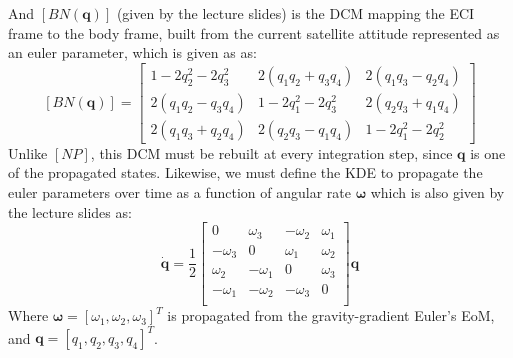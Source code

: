\documentclass[titlepage]{article}
\begin{document}
And $\left[BN(\boldsymbol{q})\right]$ (given by the lecture slides) is the DCM mapping the ECI frame to the body frame, built from the current satellite attitude represented as an euler parameter, which is given as as:
\begin{equation}
	\left[BN(\boldsymbol{q})\right]=
	\begin{bmatrix}
		1-2q_2^2-2q_3^2 & 2\left(q_1q_2+q_3q_4\right) & 2\left(q_1q_3-q_2q_4\right)\\
		2\left(q_1q_2-q_3q_4\right) & 1-2q_1^2-2q_3^2 & 2\left(q_2q_3+q_1q_4\right)\\
		2\left(q_1q_3+q_2q_4\right) & 2\left(q_2q_3-q_1q_4\right) & 1-2q_1^2-2q_2^2
	\end{bmatrix}
\end{equation}
Unlike $\left[NP\right]$, this DCM must be rebuilt at every integration step, since $\boldsymbol{q}$ is one of the propagated states. Likewise, we must define the KDE to propagate the euler parameters over time as a function of angular rate $\boldsymbol{\omega}$ which is also given by the lecture slides as:
\begin{equation}
	\dot{\boldsymbol{q}}=\frac{1}{2}
	\begin{bmatrix}
		0 & \omega_3 & -\omega_2 & \omega_1 \\
		-\omega_3 & 0 & \omega_1 & \omega_2 \\
		\omega_2 & -\omega_1 & 0 & \omega_3 \\
		-\omega_1 & -\omega_2 & -\omega_3 & 0 \\
	\end{bmatrix}\boldsymbol{q}
\end{equation}
Where $\boldsymbol{\omega}=[\omega_1, \omega_2, \omega_3]^T$ is propagated from the gravity-gradient Euler's EoM, and $\boldsymbol{q}=[q_1,q_2,q_3,q_4]^T$.\\
\end{document}
